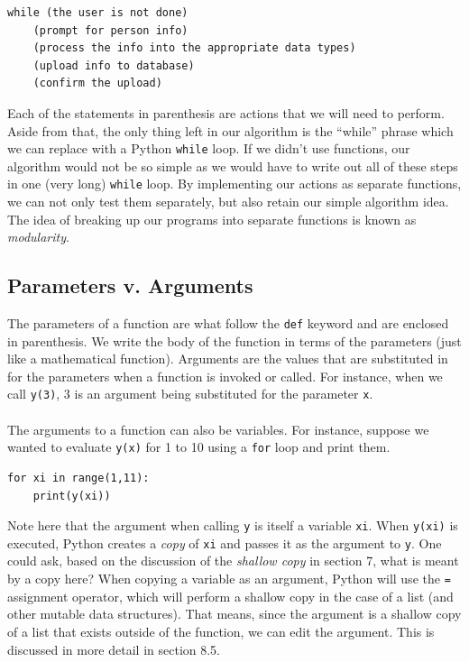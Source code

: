 \documentclass{article}
\begin{document}
\begin{verbatim}
while (the user is not done)
    (prompt for person info)
    (process the info into the appropriate data types)
    (upload info to database)
    (confirm the upload)
\end{verbatim}
Each of the statements in parenthesis are actions that we will need to perform. Aside from that, the only thing left in our algorithm is the ``while'' phrase which we can replace with a Python \texttt{while} loop. If we didn't use functions, our algorithm would not be so simple as we would have to write out all of these steps in one (very long) \texttt{while} loop. By implementing our actions as separate functions, we can not only test them separately, but also retain our simple algorithm idea. The idea of breaking up our programs into separate functions is known as \textit{modularity}.

\subsection{Parameters v. Arguments}
The parameters of a function are what follow the \texttt{def} keyword and are enclosed in parenthesis. We write the body of the function in terms of the parameters (just like a mathematical function). Arguments are the values that are substituted in for the parameters when a function is invoked or called. For instance, when we call \texttt{y(3)}, 3 is an argument being substituted for the parameter \texttt{x}.\\\\
The arguments to a function can also be variables. For instance, suppose we wanted to evaluate \texttt{y(x)} for 1 to 10 using a \texttt{for} loop and print them.
\begin{verbatim}
for xi in range(1,11):
    print(y(xi))  
\end{verbatim}
Note here that the argument when calling \texttt{y} is itself a variable \texttt{xi}. When \texttt{y(xi)} is executed, Python creates a \textit{copy} of \texttt{xi} and passes it as the argument to \texttt{y}. One could ask, based on the discussion of the \textit{shallow copy} in section 7, what is meant by a copy here? When copying a variable as an argument, Python will use the \texttt{=} assignment operator, which will perform a shallow copy in the case of a list (and other mutable data structures). That means, since the argument is a shallow copy of a list that exists outside of the function, we can edit the argument. This is discussed in more detail in section 8.5.
\end{document}
